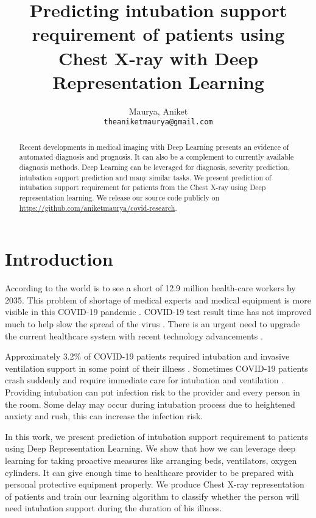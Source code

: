 \documentclass[a4paper]{article}
\title{Predicting intubation support requirement of patients using Chest X-ray with Deep Representation Learning}
\author{
  Maurya, Aniket\\
  \texttt{theaniketmaurya@gmail.com}
  


}
\begin{document}
\maketitle

\begin{abstract}
Recent developments in medical imaging with Deep Learning presents an evidence of automated diagnosis and prognosis. It can also be a complement to currently available diagnosis methods.
Deep Learning can be leveraged for diagnosis, severity prediction, intubation support prediction and many similar tasks.
We present prediction of intubation support requirement for patients from the Chest X-ray using Deep representation learning. We release our source code publicly on \href{https://github.com/aniketmaurya/covid-research}{https://github.com/aniketmaurya/covid-research}.

\end{abstract}

\section{Introduction}

According to \cite{who-staff-short} the world is to see a short of 12.9 million health-care workers by 2035.
This problem of shortage of medical experts and medical equipment is more visible in this COVID-19 pandemic \cite{india-shortage} \cite{supply-short}.
COVID-19 test result time has not improved much to help slow the spread of the virus \cite{slow_test}.
There is an urgent need to upgrade the current healthcare system with recent technology advancements \cite{who-push}.


Approximately 3.2\% of COVID-19 patients required intubation and invasive ventilation support in some point of their illness \cite{vent-count}.
Sometimes COVID-19 patients crash suddenly and require immediate care for intubation and ventilation \cite{strickland}.
Providing intubation can put infection risk to the provider and every person in the room.
Some delay may occur during intubation process due to heightened anxiety and rush, this can increase the infection risk.

In this work, we present prediction of intubation support requirement to patients using Deep Representation Learning. We show that how we can leverage deep learning for taking proactive measures like arranging beds, ventilators, oxygen cylinders. It can give enough time to healthcare provider to be prepared with personal protective equipment properly.
We produce Chest X-ray representation of patients and train our learning algorithm to classify whether the person will need intubation support during the duration of his illness.
\end{document}
